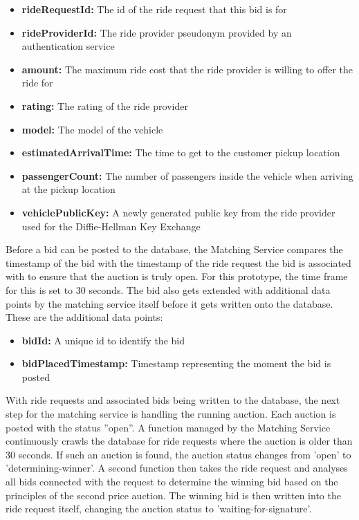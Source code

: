 \begin{itemize}
    \item \textbf{rideRequestId:} The id of the ride request that this bid is for
    \item \textbf{rideProviderId:} The ride provider pseudonym provided by an authentication service
    \item \textbf{amount:} The maximum ride cost that the ride provider is willing to offer the ride for
    \item \textbf{rating:} The rating of the ride provider
    \item \textbf{model:} The model of the vehicle
    \item \textbf{estimatedArrivalTime:} The time to get to the customer pickup location
    \item \textbf{passengerCount:} The number of passengers inside the vehicle when arriving at the pickup location
    \item \textbf{vehiclePublicKey:} A newly generated public key from the ride provider used for the Diffie-Hellman Key Exchange 
\end{itemize}

Before a bid can be posted to the database, the Matching Service compares the timestamp of the bid with the timestamp of the ride request the bid is associated with to ensure that the auction is truly open. For this prototype, the time frame for this is set to 30 seconds. The bid also gets extended with additional data points by the matching service itself before it gets written onto the database. These are the additional data points:

\begin{itemize}
    \item \textbf{bidId:} A unique id to identify the bid
    \item \textbf{bidPlacedTimestamp:} Timestamp representing the moment the bid is posted
\end{itemize}

With ride requests and associated bids being written to the database, the next step for the matching service is handling the running auction. Each auction is posted with the status ''open''. A function managed by the Matching Service continuously crawls the database for ride requests where the auction is older than 30 seconds. If such an auction is found, the auction status changes from 'open' to 'determining-winner'. A second function then takes the ride request and analyses all bids connected with the request to determine the winning bid based on the principles of the second price auction. The winning bid is then written into the ride request itself, changing the auction status to 'waiting-for-signature'. 

